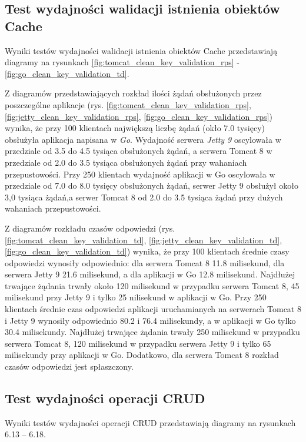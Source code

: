 
\clearpage

\subsection{Test wydajności walidacji istnienia obiektów Cache}
Wyniki testów wydajności walidacji istnienia obiektów Cache przedstawiają diagramy na rysunkach \ref{fig:tomcat_clean_key_validation_rps} - \ref{fig:go_clean_key_validation_td}.              

Z diagramów przedstawiających rozkład ilości żądań obsłużonych przez poszczególne aplikacje  (rys. \ref{fig:tomcat_clean_key_validation_rps}, \ref{fig:jetty_clean_key_validation_rps}, \ref{fig:go_clean_key_validation_rps}) wynika, że przy 100 klientach największą liczbę żądań (okło 7.0 tysięcy) obsłużyła aplikacja napisana w \textsl{Go}. Wydajność serwera \textsl{Jetty 9} oscylowała w przedziale od 3.5 do 4.5 tysiąca obsłużonych żądań, a serwera Tomcat 8 w przedziale od 2.0 do 3.5 tysiąca obsłużonych żądań przy wahaniach przepustowości. Przy 250 klientach wydajność aplikacji w Go oscylowała w przedziale od 7.0 do 8.0 tysięcy obsłużonych żądań, serwer Jetty 9 obsłużył około 3,0 tysiąca żądań,a serwer Tomcat 8 od 2.0 do 3.5 tysiąca żądań przy dużych wahaniach przepustowości.


Z diagramów rozkładu czasów odpowiedzi (rys. \ref{fig:tomcat_clean_key_validation_td}, \ref{fig:jetty_clean_key_validation_td}, \ref{fig:go_clean_key_validation_td}) wynika, że przy 100 klientach średnie czasy odpowiedzi wynosiły odpowiednio: dla serwera Tomcat 8 11.8 milisekund, dla serwera Jetty 9 21.6 milisekund, a dla aplikacji w Go 12.8 milisekund. Najdłużej trwające żądania trwały około 120 milisekund w przypadku serwera Tomcat 8, 45 milisekund przy  Jetty 9 i tylko 25 nilisekund w aplikacji w Go. Przy 250 klientach średnie czas odpowiedzi aplikacji uruchamianych na serwerach Tomcat 8 i Jetty 9  wynosiły  odpowiednio 80.2 i 76.4 milisekundy, a w aplikacji w Go tylko 30.4 milisekundy. Najdłużej trwające żądania trwały 250 milisekund w przypadku serwera Tomcat 8, 120 milisekund w przypadku serwera Jetty 9 i tylko 65 milisekundy przy aplikacji w Go. Dodatkowo, dla serwera Tomcat 8  rozkład czasów odpowiedzi jest spłaszczony. 


\clearpage

\subsection{Test wydajności operacji CRUD}
Wyniki testów wydajności operacji CRUD przedstawiają diagramy na rysunkach 6.13 – 6.18.

